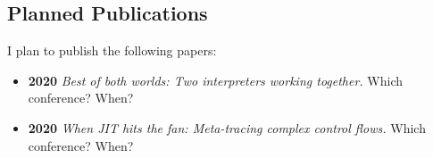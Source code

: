 \subsection{Planned Publications}

I plan to publish the following papers:

\begin{itemize}
\item \textbf{2020} \emph{Best of both worlds: Two interpreters working together.} Which conference? When?
\item \textbf{2020} \emph{When JIT hits the fan: Meta-tracing complex control flows.} Which conference? When?
\end{itemize}

